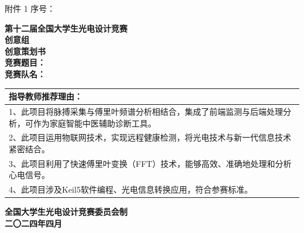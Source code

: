 \documentclass[a4paper,12pt]{article}
\begin{document}
\begin{titlepage}
    \vspace*{1cm}
    \noindent 附件 1 \hfill \Large 序号：\underline{}\\[2.5cm]
    
    \begin{center}
        {\Huge \textbf{第十二届全国大学生光电设计竞赛}}\\[0.8cm]
        {\Huge \textbf{创意组}}\\[2.5cm]
        
        {\fontsize{36pt}{40pt}\selectfont \textbf{创意策划书}}\\[3cm]
        
        {\Large \textbf{竞赛题目：}\underline{}}\\[1cm]
        {\Large \textbf{竞赛队名：}\underline{}}\\[2cm]
    \end{center}
    
    \begin{table}[H]
        \centering
        \renewcommand{\arraystretch}{1.8}
        \begin{tabular}{|p{15cm}|}
        \hline
        \textbf{指导教师推荐理由：} \\
        \hline
        1、此项目将脉搏采集与傅里叶频谱分析相结合，集成了前端监测与后端处理分析，可作为家庭智能中医辅助诊断工具。 \\
        \hline
        2、此项目运用物联网技术，实现远程健康检测，将光电技术与新一代信息技术紧密结合。 \\
        \hline
        3、此项目利用了快速傅里叶变换（FFT）技术，能够高效、准确地处理和分析心电信号。 \\
        \hline
        4、此项目涉及Keil5软件编程、光电信息转换应用，符合参赛标准。 \\
        \hline
        \end{tabular}
    \end{table}
    
    \vfill
    \begin{center}
        {\Large \textbf{全国大学生光电设计竞赛委员会制}}\\[0.5cm]
        {\Large \textbf{二〇二四年四月}}
    \end{center}
\end{titlepage}

\newpage
\end{document}
